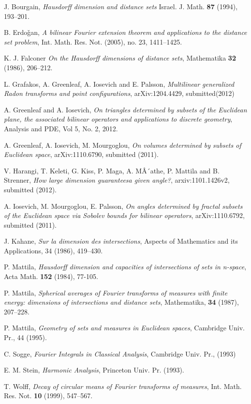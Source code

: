 \documentclass{amsproc}
\numberwithin{equation}{section}
\theoremstyle{plain}
\theoremstyle{definition}
\theoremstyle{remark}
\numberwithin{equation}{section}
\begin{document}
\newpage
\begin{thebibliography}{8}

 J. Bourgain, {\it Hausdorff dimension and distance sets} Israel. J. Math. \textbf{87} (1994), 193--201. 

 B. Erdo\v{g}an, {\it A bilinear Fourier extension theorem and applications to the distance set problem}, Int. Math. Res. Not. (2005), no. 23, 1411--1425.

 K. J. Falconer {\it On the Hausdorff dimensions of distance sets}, Mathematika \textbf{32} (1986), 206--212.

 L. Grafakos, A. Greenleaf, A. Iosevich and E. Palsson,
  {\it Multilinear generalized Radon transforms and point
    configurations}, arXiv:1204.4429, submitted(2012)

 A. Greenleaf and A. Iosevich, {\it On triangles
    determined by subsets of the Euclidean plane, the associated
    bilinear operators and applications to discrete geometry},
  Analysis and PDE, Vol 5, No. 2, 2012.

 A. Greenleaf, A. Iosevich, M. Mourgoglou, {\it On
    volumes determined by subsets of Euclidean space},
  arXiv:1110.6790, submitted (2011).

 V. Harangi, T. Keleti, G. Kiss, P. Maga, A. MÂ´athe,
  P. Mattila and B. Strenner, {\it How large dimension guaranteesa
    given angle?}, arxiv:1101.1426v2, submitted (2012).

 A. Iosevich, M. Mourgoglou, E. Palsson, {\it On angles
    determined by fractal subsets of the Euclidean space via Sobolev
    bounds for bilinear operators}, arXiv:1110.6792, submitted (2011).

 J. Kahane, {\it Sur la dimension des intersections},
  Aspects of Mathematics and its Applications,  34 (1986),
  419--430.

 P. Mattila, {\it Hausdorff dimension and capacities of
    intersections of sets in n-space}, Acta Math. \textbf{152} (1984),
  77-105.
 
 P. Mattila, {\it Spherical averages of Fourier transforms of measures with finite energy: dimensions of intersections and distance sets}, Mathematika, \textbf{34} (1987),  207--228.

 P. Mattila, {\it Geometry of sets and measures in Euclidean spaces}, Cambridge Univ. Pr.,  44 (1995). 

 C. Sogge, {\it Fourier Integrals in Classical
    Analysis}, Cambridge Univ. Pr., (1993)

 E. M. Stein, {\it Harmonic Analysis}, Princeton Univ. Pr. (1993). 

 T. Wolff, {\it Decay of circular means of Fourier
    transforms of measures}, Int. Math. Res. Not.  \textbf{10} (1999),
  547--567.

\end{thebibliography}
\end{document}

